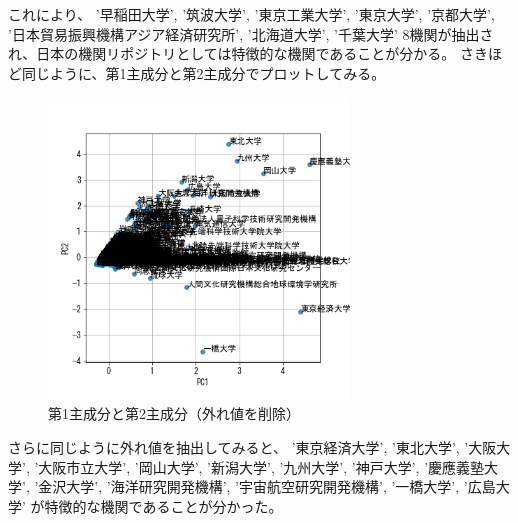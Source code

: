\documentclass[submit,noauthor]{ono}
\begin{document}
これにより、
'早稲田大学', '筑波大学', '東京工業大学', '東京大学', '京都大学', '日本貿易振興機構アジア経済研究所', '北海道大学', '千葉大学'
8機関が抽出され、日本の機関リポジトリとしては特徴的な機関であることが分かる。
さきほど同じように、第1主成分と第2主成分でプロットしてみる。
\begin{figure}[h]
	\includegraphics[width=8cm]{./picture/pc1pc2_outlier.png}
	\caption{第1主成分と第2主成分（外れ値を削除）}
	\label{fig:pc1pc2_outlier}
\end{figure}

さらに同じように外れ値を抽出してみると、
'東京経済大学', '東北大学', '大阪大学', '大阪市立大学', '岡山大学', '新潟大学', '九州大学', '神戸大学', '慶應義塾大学', '金沢大学', '海洋研究開発機構', '宇宙航空研究開発機構', '一橋大学', '広島大学'
が特徴的な機関であることが分かった。




	
	
	
\end{document}
